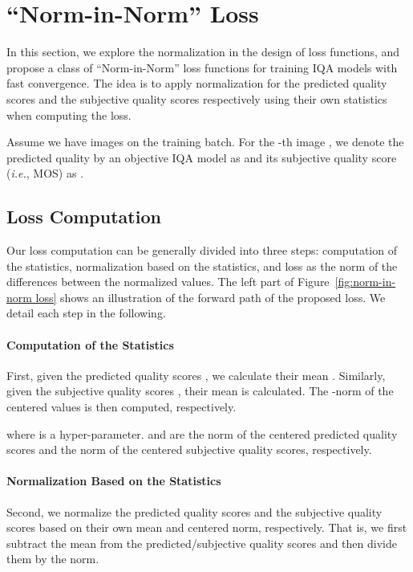 \documentclass[sigconf]{acmart}
\begin{document}
\section{``Norm-in-Norm'' Loss}
\label{sec:loss}

In this section, we explore the normalization in the design of loss functions, and propose a class of ``Norm-in-Norm'' loss functions for training IQA models with fast convergence.
The idea is to apply normalization for the predicted quality scores and the subjective quality scores respectively using their own statistics when computing the loss. 

Assume we have  images on the training batch. 
For the -th image , we denote the predicted quality by an objective IQA model  as  and its subjective quality score (\textit{i.e.}, MOS) as .

\subsection{Loss Computation}
\label{sec:loss computation}
Our loss computation can be generally divided into three steps: computation of the statistics, normalization based on the statistics, and loss as the norm of the differences between the normalized values.
The left part of Figure~\ref{fig:norm-in-norm loss} shows an illustration of the forward path of the proposed loss. 
We detail each step in the following.

\paragraph{Computation of the Statistics} 
First, given the predicted quality scores , we calculate their mean . 
Similarly, given the subjective quality scores , their mean  is calculated. 
The -norm of the centered values is then computed, respectively.

where  is a hyper-parameter.  and  are the norm of the centered predicted quality scores and the norm of the centered subjective quality scores, respectively.

\paragraph{Normalization Based on the Statistics}
Second, we normalize the predicted quality scores and the subjective quality scores based on their own mean and centered norm, respectively. That is, we first subtract the mean from the predicted/subjective quality scores and then divide them by the norm. 
\end{document}
